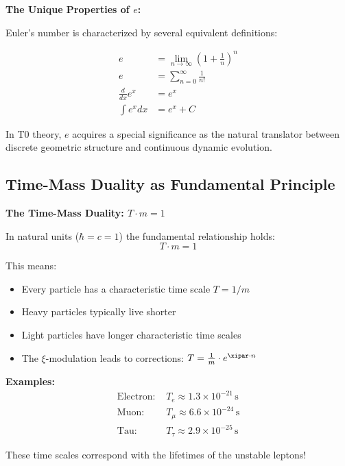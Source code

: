 	\begin{relation}
		\textbf{The Unique Properties of $e$:}
		
		Euler's number is characterized by several equivalent definitions:
		
		\begin{align}
			e &= \lim_{n \to \infty} \left(1 + \frac{1}{n}\right)^n \\
			e &= \sum_{n=0}^{\infty} \frac{1}{n!} \\
			\frac{d}{dx}e^x &= e^x \\
			\int e^x dx &= e^x + C
		\end{align}
		
		In T0 theory, $e$ acquires a special significance as the natural translator between discrete geometric structure and continuous dynamic evolution.
	\end{relation}
	
	\subsection{Time-Mass Duality as Fundamental Principle}
	
	\begin{insight}
		\textbf{The Time-Mass Duality: $T \cdot m = 1$}
		
		In natural units ($\hbar = c = 1$) the fundamental relationship holds:
		\begin{equation}
			\boxed{T \cdot m = 1}
		\end{equation}
		
		This means:
		\begin{itemize}
			\item Every particle has a characteristic time scale $T = 1/m$
			\item Heavy particles typically live shorter
			\item Light particles have longer characteristic time scales
			\item The $\xi$-modulation leads to corrections: $T = \frac{1}{m} \cdot e^{\xipar \cdot n}$
		\end{itemize}
		
		\textbf{Examples:}
		\begin{align}
			\text{Electron: } & T_e \approx 1.3 \times 10^{-21}\, \text{s} \\
			\text{Muon: } & T_\mu \approx 6.6 \times 10^{-24}\, \text{s} \\
			\text{Tau: } & T_\tau \approx 2.9 \times 10^{-25}\, \text{s}
		\end{align}
		
		These time scales correspond with the lifetimes of the unstable leptons!
	\end{insight}
	
